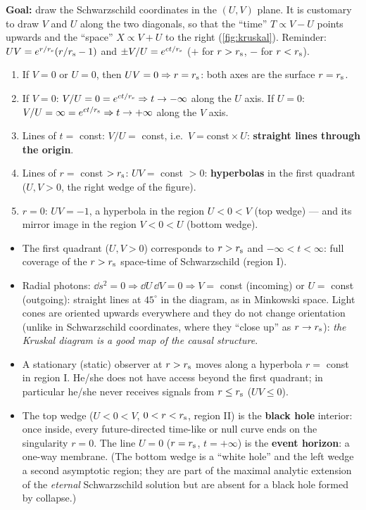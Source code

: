\textbf{Goal:} draw the Schwarzschild coordinates in the $(U,V)$ plane. It is customary to draw $V$ and $U$ along the two diagonals, so that the ``time'' $T\propto V-U$ points upwards and the ``space'' $X\propto V+U$ to the right (\cref{fig:kruskal}). Reminder: $UV=e^{r/r_{\mathrm s}}(r/r_{\mathrm s}-1)$ and $\pm V/U=e^{ct/r_{\mathrm s}}$ ($+$ for $r>r_{\mathrm s}$, $-$ for $r<r_{\mathrm s}$).
\begin{enumerate}
\item If $V=0$ or $U=0$, then $UV=0\Rightarrow r=r_{\mathrm s}$: both axes are the surface $r=r_{\mathrm s}$.
\item If $V=0$: $V/U=0=e^{ct/r_{\mathrm s}}\Rightarrow t\to-\infty$ along the $U$ axis. If $U=0$: $V/U=\infty=e^{ct/r_{\mathrm s}}\Rightarrow t\to+\infty$ along the $V$ axis.
\item Lines of $t=$ const: $V/U=$ const, i.e.\ $V=\text{const}\times U$: \textbf{straight lines through the origin}.
\item Lines of $r=$ const $>r_{\mathrm s}$: $UV=$ const $>0$: \textbf{hyperbolas} in the first quadrant ($U,V>0$, the right wedge of the figure).
\item $r=0$: $UV=-1$, a hyperbola in the region $U<0<V$ (top wedge) --- and its mirror image in the region $V<0<U$ (bottom wedge).
\end{enumerate}
\begin{itemize}
\item The first quadrant ($U,V>0$) corresponds to $r>r_{\mathrm s}$ and $-\infty<t<\infty$: full coverage of the $r>r_{\mathrm s}$ space-time of Schwarzschild (region I).
\item Radial photons: $\dd s^2=0\Rightarrow\dd U\,\dd V=0\Rightarrow V=$ const (incoming) or $U=$ const (outgoing): straight lines at $45^\circ$ in the diagram, as in Minkowski space. Light cones are oriented upwards everywhere and they do not change orientation (unlike in Schwarzschild coordinates, where they ``close up'' as $r\to r_{\mathrm s}$): \emph{the Kruskal diagram is a good map of the causal structure}.
\item A stationary (static) observer at $r>r_{\mathrm s}$ moves along a hyperbola $r=$ const in region I. He/she does not have access beyond the first quadrant; in particular he/she never receives signals from $r\le r_{\mathrm s}$ ($UV\le0$).
\item The top wedge ($U<0<V$, $0<r<r_{\mathrm s}$, region II) is the \textbf{black hole} interior: once inside, every future-directed time-like or null curve ends on the singularity $r=0$. The line $U=0$ ($r=r_{\mathrm s}$, $t=+\infty$) is the \textbf{event horizon}: a one-way membrane. (The bottom wedge is a ``white hole'' and the left wedge a second asymptotic region; they are part of the maximal analytic extension of the \emph{eternal} Schwarzschild solution but are absent for a black hole formed by collapse.)
\end{itemize}

